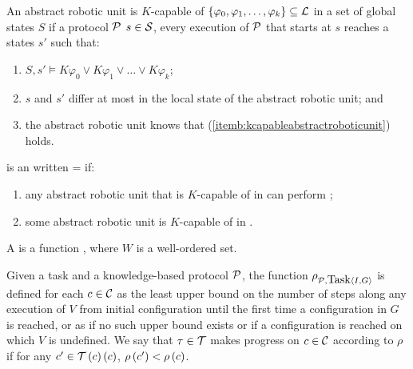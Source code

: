 \begin{defi}
An abstract robotic unit is $K$-capable of $\left\{ \varphi_0,\varphi_1,\ldots,\varphi_k\right\}\subseteq\mathcal{L}$ in a set of global states $S$ if \teTx{} a protocol $\mathcal{P}$ \stTx{} \feTx{} $s\in\mathcal{S}$, every execution of $\mathcal{P}$ that starts at $s$ reaches a states $s'$ such that:
\begin{enumerate}
 \item $S,s'\vDash K\varphi_0\vee K\varphi_1\vee\ldots\vee K\varphi_k$;
 \item\label{itemb:kcapableabstractroboticunit} $s$ and $s'$ differ at most in the local state of the abstract robotic unit; and
 \item the abstract robotic unit knows that (\ref{itemb:kcapableabstractroboticunit}) holds.
\end{enumerate}
\cite{conf/ijcai/BrafmanS95}
\end{defi}

\begin{defi}
 is an   written = if:
\begin{enumerate}
 \item any abstract robotic unit that is $K$-capable of  in  can perform ;
 \item some abstract robotic unit is $K$-capable of  in .
\end{enumerate}
\cite{conf/ijcai/BrafmanS95}
\end{defi}

\begin{defi}
A   is a function , where $W$ is a well-ordered set.
\cite{conf/ijcai/BrafmanS95}
\end{defi}

\begin{defi}
Given a task  and a knowledge-based protocol $\mathcal{P}$, the function $\rho_{\mathcal{P},\mbox{Task}\left\langle I,G\right\rangle}$ is defined for each $c\in\mathcal{C}$ as the least upper bound on the number of steps along any execution of $V$ from initial configuration  until the first time a configuration in $G$ is reached, or as if no such upper bound exists or if a configuration is reached on which $V$ is undefined. We say that $\tau\in\mathcal{T}$ makes progress on $c\in\mathcal{C}$ according to $\rho$ if for any $c'\in\mathcal{T}\left(c\right)\left( c\right)$, $\rho\left(c'\right)<\rho\left(c\right)$.
\cite{conf/ijcai/BrafmanS95}
\end{defi}